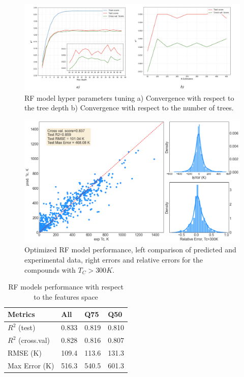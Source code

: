 \begin{figure}[H]
\centering
\captionsetup{justification=centering,margin=2cm}
	\includegraphics[width=160mm]{fig/ml_fig/rf_convergence.png}
	\caption[RF model hyper parameters tuning.]{RF model hyper parameters tuning a) Convergence with respect to the tree depth b) Convergence with respect to the number of trees.}
\label{fig:rf_convergence}
\end{figure}


\begin{figure}[H]
\centering
\captionsetup{justification=centering,margin=2cm}
	\includegraphics[width=160mm]{fig/ml_fig/rf_results.png}
	\caption[Optimized RF model performance, left comparison of predicted and experimental data.]{Optimized RF model performance, left comparison of predicted and experimental data, right errors and relative errors for the compounds with $T_C>300K$.}
\label{fig:rf_results}
\end{figure}


\begin{table}[H]
\centering
\caption{RF models performance with respect to the features space}
\begin{tabular}{|p{3.5cm}|p{3cm}|p{3cm}|p{3cm}|}
\hline 
Metrics & All & Q75 & Q50 \\ 
\hline 
$R^2$ (test) & 0.833 & 0.819 & 0.810 \\ 
$R^2$ (cross.val) & 0.828 & 0.816 & 0.807 \\ 
RMSE (K) & 109.4 & 113.6 & 131.3 \\ 
Max Error (K) & 516.3 & 540.5 & 601.3 \\ 
\hline 
\end{tabular} 
\label{tab:rf_results}
\end{table}

